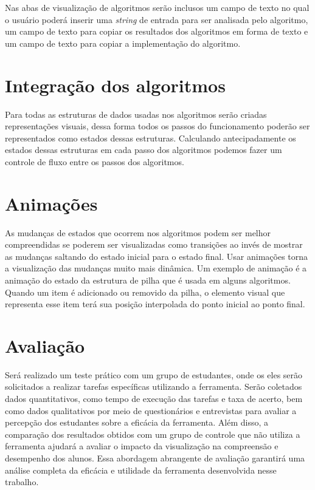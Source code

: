 Nas abas de visualização de algoritmos serão inclusos um campo de texto no qual o usuário poderá inserir uma \textit{string} de entrada para ser analisada pelo algoritmo, um campo de texto para copiar os resultados dos algoritmos em forma de texto e um campo de texto para copiar a implementação do algoritmo.

\section{Integração dos algoritmos}
Para todas as estruturas de dados usadas nos algoritmos serão criadas representações visuais, dessa forma todos os passos do funcionamento poderão ser representados como estados dessas estruturas. Calculando antecipadamente os estados dessas estruturas em cada passo dos algoritmos podemos fazer um controle de fluxo entre os passos dos algoritmos.

\section{Animações}
As mudanças de estados que ocorrem nos algoritmos podem ser melhor compreendidas se poderem ser visualizadas como transições ao invés de mostrar as mudanças saltando do estado inicial para o estado final. Usar animações torna a visualização das mudanças muito mais dinâmica. Um exemplo de animação é a animação do estado da estrutura de pilha que é usada em alguns algoritmos. Quando um item é adicionado ou removido da pilha, o elemento visual que representa esse item terá sua posição interpolada do ponto inicial ao ponto final.

\section{Avaliação}
Será realizado um teste prático com um grupo de estudantes, onde os eles serão solicitados a realizar tarefas específicas utilizando a ferramenta. Serão coletados dados quantitativos, como tempo de execução das tarefas e taxa de acerto, bem como dados qualitativos por meio de questionários e entrevistas para avaliar a percepção dos estudantes sobre a eficácia da ferramenta. Além disso, a comparação dos resultados obtidos com um grupo de controle que não utiliza a ferramenta ajudará a avaliar o impacto da visualização na compreensão e desempenho dos alunos. Essa abordagem abrangente de avaliação garantirá uma análise completa da eficácia e utilidade da ferramenta desenvolvida nesse trabalho.

